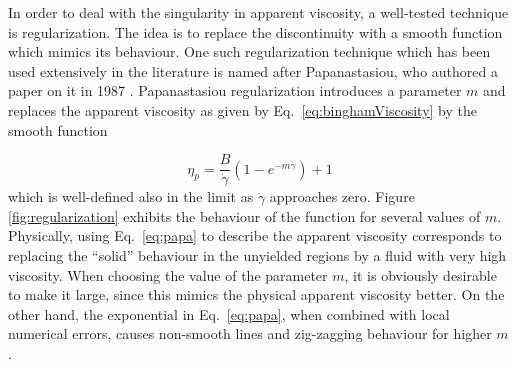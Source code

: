 \documentclass[final,3p,twocolumn]{elsarticle}
\begin{document}
In order to deal with the singularity in apparent viscosity, a well-tested
technique is regularization. The idea is to replace the discontinuity with a
smooth function which mimics its behaviour. One such regularization technique
which has been used extensively in the literature \cite{mitsoulis2001flow, syrakos2013solution, syrakos2014performance}
is named after Papanastasiou, who authored a paper on it in 1987
\cite{papanastasiou1987flows}. Papanastasiou regularization introduces a
parameter $m$ and replaces the apparent viscosity as given by Eq.\
\eqref{eq:binghamViscosity} by the smooth function 

\begin{equation}
    \eta_p = \frac{B}{\dot{\gamma}} \left(1-e^{-m\dot{\gamma}} \right) + 1
    \label{eq:papa}
\end{equation}
%
which is well-defined also in the limit as $\dot{\gamma}$ approaches zero.
Figure \ref{fig:regularization} exhibits the behaviour of the function for
several values of $m$. Physically, using Eq.\ \eqref{eq:papa} to describe the
apparent viscosity corresponds to replacing the ``solid'' behaviour in the
unyielded regions by a fluid with very high viscosity. When choosing the value
of the parameter $m$, it is obviously desirable to make it large, since this
mimics the physical apparent viscosity better. On the other hand, the exponential in Eq.\
\eqref{eq:papa}, when combined with local numerical errors, causes non-smooth
lines and zig-zagging behaviour for higher $m$ \cite{mitsoulis2001flow}. 
\end{document}
